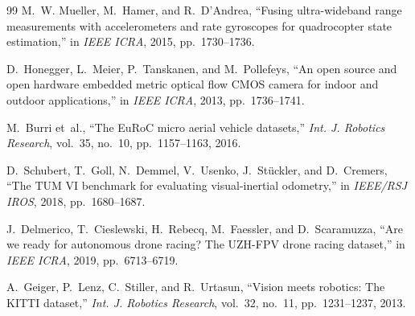 \documentclass[11pt]{article}
\begin{document}
\begin{thebibliography}{99}
M.~W. Mueller, M.~Hamer, and R.~D'Andrea, ``Fusing ultra-wideband range measurements with
accelerometers and rate gyroscopes for quadrocopter state estimation,'' in \emph{IEEE ICRA}, 2015,
pp.~1730--1736.

D.~Honegger, L.~Meier, P.~Tanskanen, and M.~Pollefeys, ``An open source and open hardware embedded
metric optical flow CMOS camera for indoor and outdoor applications,'' in \emph{IEEE ICRA}, 2013,
pp.~1736--1741.

M.~Burri et~al., ``The EuRoC micro aerial vehicle datasets,'' \emph{Int. J. Robotics Research},
vol.~35, no.~10, pp.~1157--1163, 2016.

D.~Schubert, T.~Goll, N.~Demmel, V.~Usenko, J.~St\"uckler, and D.~Cremers, ``The TUM VI benchmark for
evaluating visual-inertial odometry,'' in \emph{IEEE/RSJ IROS}, 2018, pp.~1680--1687.

J.~Delmerico, T.~Cieslewski, H.~Rebecq, M.~Faessler, and D.~Scaramuzza, ``Are we ready for autonomous
drone racing? The UZH-FPV drone racing dataset,'' in \emph{IEEE ICRA}, 2019, pp.~6713--6719.

A.~Geiger, P.~Lenz, C.~Stiller, and R.~Urtasun, ``Vision meets robotics: The KITTI dataset,''
\emph{Int. J. Robotics Research}, vol.~32, no.~11, pp.~1231--1237, 2013.

\end{thebibliography}
\end{document}
